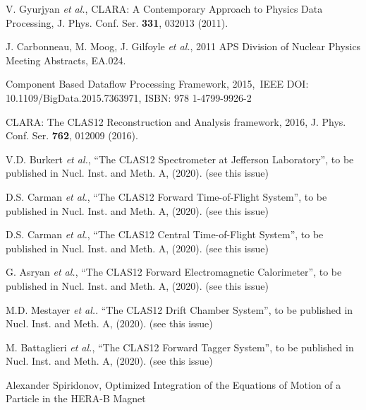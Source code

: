 \documentclass{elsart}
\begin{document}
\begin{thebibliography}{99}

V. Gyurjyan {\it et al.}, CLARA: A Contemporary Approach to Physics Data Processing, J. Phys. Conf. Ser.
{\bf 331}, 032013 (2011).

J. Carbonneau, M. Moog,  J. Gilfoyle {\it et al.}, 2011 APS Division of Nuclear Physics Meeting Abstracts, EA.024.

  Component Based Dataflow Processing Framework, 2015, IEEE DOI: 10.1109/BigData.2015.7363971,
  ISBN: 978 1-4799-9926-2

CLARA: The CLAS12 Reconstruction and Analysis framework, 2016, J. Phys. Conf. Ser. {\bf 762}, 012009 (2016).

V.D. Burkert {\it et al.}, ``The CLAS12 Spectrometer at Jefferson Laboratory'', to be published in Nucl.
Inst. and Meth. A, (2020). (see this issue)

D.S. Carman {\it et al.},   ``The CLAS12 Forward Time-of-Flight System'', to be published in Nucl.
Inst. and Meth. A, (2020). (see this issue)

D.S. Carman {\it et al.}, ``The CLAS12 Central Time-of-Flight System'', to be published in Nucl.
Inst. and Meth. A, (2020). (see this issue)

G. Asryan {\it et al.}, ``The CLAS12 Forward Electromagnetic Calorimeter'', to be published in Nucl.
Inst. and Meth. A, (2020). (see this issue)

M.D. Mestayer {\it et al.}. ``The CLAS12 Drift Chamber System'', to be published in Nucl. Inst. and
Meth. A, (2020). (see this issue)

M. Battaglieri {\it et al.}, ``The CLAS12 Forward Tagger System'', to be published in Nucl. Inst. and
Meth. A, (2020). (see this issue)

Alexander Spiridonov, Optimized Integration of the Equations of Motion of a Particle in the HERA-B Magnet

\end{thebibliography}
\end{document}
